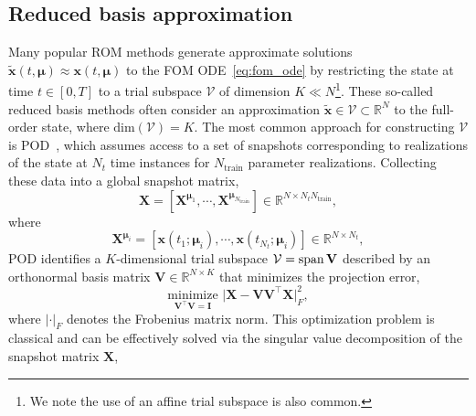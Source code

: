 \documentclass[3p,computermodern,11pt]{elsarticle}
\numberwithin{equation}{section}
\newcommand{\nt}{N_t}
\newcommand{\snapshotsState}{\mathbf{X}}
\newcommand{\defeq}{:=}
\newcommand{\state}{\boldsymbol x}
\newcommand{\approxState}{\tilde{\state}}
\newcommand{\refState}{\state_{\text{ref}}}
\newcommand{\romTrialSpace}{\mathcal{V}}
\newcommand{\romBasis}{\mathbf{V}}
\newcommand{\romBasisVector}{\mathbf{v}}
\newcommand{\params}{\boldsymbol \mu}
\newcommand{\timeDomain}{[0,T]}
\newcommand{\RR}[1]{\mathbb{R}^{#1}}
\newcommand{\fomDim}{N}
\newcommand{\romDim}{K}
\newcommand{\nTrain}{N_{\text{train}}}
\begin{document}
\subsection{Reduced basis approximation}
Many popular ROM methods generate approximate solutions $\approxState(t,\params) \approx \state(t,\params)$ to the FOM ODE~\eqref{eq:fom_ode} by restricting the state at time $t \in \timeDomain$ to a trial subspace $\romTrialSpace$ of dimension $\romDim \ll \fomDim$\footnote{We note the use of an affine trial subspace is also common.}.  These so-called reduced basis methods often consider an approximation $\approxState \in  \romTrialSpace \subset \RR{\fomDim}$ to the full-order state, where $\text{dim}(\romTrialSpace) = \romDim$. The most common approach for constructing $\romTrialSpace$ is POD~\cite{BeHoLu93}, which assumes access to a set of snapshots corresponding to realizations of the state at $\nt$ time instances for $\nTrain$ parameter realizations.  Collecting these data into a global snapshot matrix,
\begin{equation}\label{eq:state_snapshots}
\snapshotsState = \left[ \snapshotsState^{\params_1} , \cdots, \snapshotsState^{\params_{\nTrain}} \right] \in \RR{\fomDim \times \nt \nTrain},
\end{equation}
where
$$\snapshotsState^{\params_i} = \left[ \state(t_1;\params_i), \cdots, \state(t_{\nt};\params_{i}) \right] \in \RR{\fomDim \times \nt},$$
POD identifies a $\romDim$-dimensional trial subspace $\romTrialSpace = {\rm span}\,\romBasis$ described by an orthonormal basis matrix $\romBasis\in\mathbb{R}^{\fomDim\times\romDim}$ that minimizes the projection error,
$$\underset{\romBasis^\intercal \romBasis = \mathbf{I} }{\mathrm{minimize} }\,\, \big|  \snapshotsState - \romBasis \romBasis^\intercal  \snapshotsState  \big|_F^2,$$
where $|\cdot|_F$ denotes the Frobenius matrix norm.
This optimization problem is classical and can be effectively solved via the singular value decomposition of the snapshot matrix $\snapshotsState$, 
\end{document}
